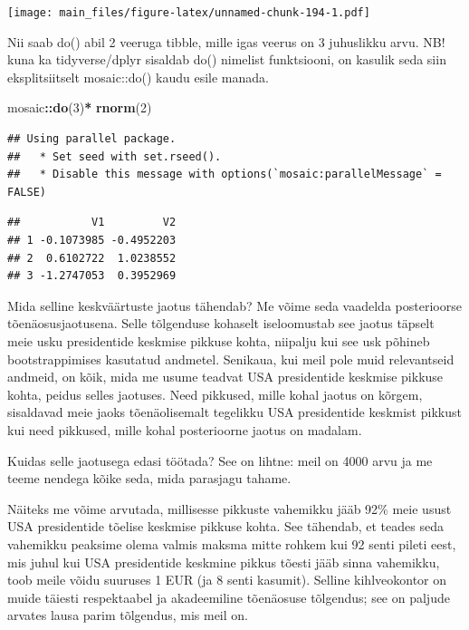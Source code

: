 \documentclass[]{book}
\newenvironment{Shaded}{\begin{snugshade}}{\end{snugshade}}
\newcommand{\KeywordTok}[1]{\textcolor[rgb]{0.13,0.29,0.53}{\textbf{#1}}}
\newcommand{\DecValTok}[1]{\textcolor[rgb]{0.00,0.00,0.81}{#1}}
\newcommand{\StringTok}[1]{\textcolor[rgb]{0.31,0.60,0.02}{#1}}
\newcommand{\OperatorTok}[1]{\textcolor[rgb]{0.81,0.36,0.00}{\textbf{#1}}}
\newcommand{\NormalTok}[1]{#1}
\begin{document}
\texttt{[image: main\_files/figure-latex/unnamed-chunk-194-1.pdf]}

Nii saab do() abil 2 veeruga tibble, mille igas veerus on 3 juhuslikku
arvu. NB! kuna ka tidyverse/dplyr sisaldab do() nimelist funktsiooni, on
kasulik seda siin eksplitsiitselt mosaic::do() kaudu esile manada.

\begin{Shaded}
\begin{Highlighting}[]
\NormalTok{mosaic}\OperatorTok{::}\KeywordTok{do}\NormalTok{(}\DecValTok{3}\NormalTok{)}\OperatorTok{*}\StringTok{ }\KeywordTok{rnorm}\NormalTok{(}\DecValTok{2}\NormalTok{)}
\end{Highlighting}
\end{Shaded}

\begin{verbatim}
## Using parallel package.
##   * Set seed with set.rseed().
##   * Disable this message with options(`mosaic:parallelMessage` = FALSE)
\end{verbatim}

\begin{verbatim}
##           V1         V2
## 1 -0.1073985 -0.4952203
## 2  0.6102722  1.0238552
## 3 -1.2747053  0.3952969
\end{verbatim}

Mida selline keskväärtuste jaotus tähendab? Me võime seda vaadelda
posterioorse tõenäosusjaotusena. Selle tõlgenduse kohaselt iseloomustab
see jaotus täpselt meie usku presidentide keskmise pikkuse kohta,
niipalju kui see usk põhineb bootstrappimises kasutatud andmetel.
Senikaua, kui meil pole muid relevantseid andmeid, on kõik, mida me
usume teadvat USA presidentide keskmise pikkuse kohta, peidus selles
jaotuses. Need pikkused, mille kohal jaotus on kõrgem, sisaldavad meie
jaoks tõenäolisemalt tegelikku USA presidentide keskmist pikkust kui
need pikkused, mille kohal posterioorne jaotus on madalam.

Kuidas selle jaotusega edasi töötada? See on lihtne: meil on 4000 arvu
ja me teeme nendega kõike seda, mida parasjagu tahame.

Näiteks me võime arvutada, millisesse pikkuste vahemikku jääb 92\% meie
usust USA presidentide tõelise keskmise pikkuse kohta. See tähendab, et
teades seda vahemikku peaksime olema valmis maksma mitte rohkem kui 92
senti pileti eest, mis juhul kui USA presidentide keskmine pikkus tõesti
jääb sinna vahemikku, toob meile võidu suuruses 1 EUR (ja 8 senti
kasumit). Selline kihlveokontor on muide täiesti respektaabel ja
akadeemiline tõenäosuse tõlgendus; see on paljude arvates lausa parim
tõlgendus, mis meil on.
\end{document}
